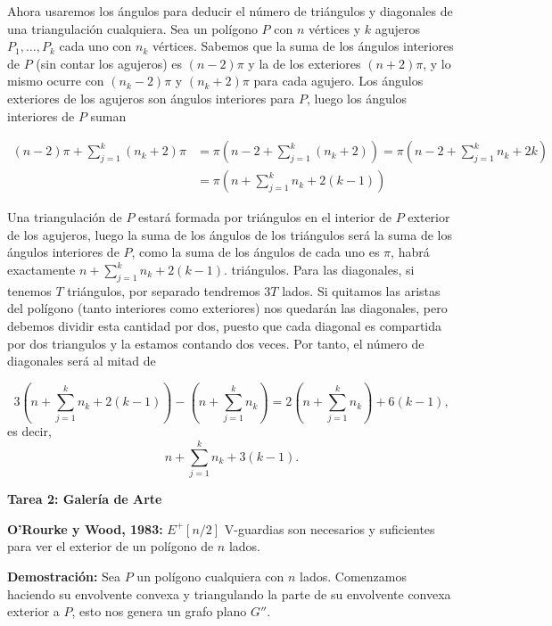 \documentclass{amsart}
\begin{document}
Ahora usaremos los ángulos para deducir el número de triángulos y diagonales de una triangulación cualquiera. Sea un polígono $P$ con $n$ vértices y $k$ agujeros $P_1,\ldots, P_k$ cada uno con $n_k$ vértices. Sabemos que la suma de los ángulos interiores de $P$ (sin contar los agujeros) es $(n-2)\pi$ y la de los exteriores $(n+2)\pi$, y lo mismo ocurre con $(n_k-2)\pi$ y $(n_k+2)\pi$ para cada agujero. Los ángulos exteriores de los agujeros son ángulos interiores para $P$, luego los ángulos interiores de $P$ suman

\begin{align*}
(n-2)\pi+\sum_{j=1}^k (n_k+2)\pi&=\pi\left(n-2+\sum_{j=1}^k (n_k+2)\right)=\pi\left(n-2+\sum_{j=1}^k n_k+2k\right)\\&=\pi\left(n+\sum_{j=1}^k n_k+2(k-1)\right)
\end{align*}

Una triangulación de $P$ estará formada por triángulos en el interior de $P$ exterior de los agujeros, luego la suma de los ángulos de los triángulos será la suma de los ángulos interiores de $P$, como la suma de los ángulos de cada uno es $\pi$, habrá exactamente $n+\sum\limits_{j=1}^k n_k+2(k-1)$. triángulos. Para las diagonales, si tenemos $T$ triángulos, por separado tendremos $3T$ lados. Si quitamos las aristas del polígono (tanto interiores como exteriores) nos quedarán las diagonales, pero debemos dividir esta cantidad por dos, puesto que cada diagonal es compartida por dos triangulos y la estamos contando dos veces. Por tanto, el número de diagonales será al mitad de 

\[3\left(n+\sum_{j=1}^k n_k+2(k-1)\right)-\left(n+\sum_{j=1}^k n_k\right)=2\left(n+\sum_{j=1}^k n_k\right)+6(k-1),\]
es decir,
\[n+\sum_{j=1}^k n_k+3(k-1).\]

\bigskip

\begin{center}
	\textbf{\large Tarea 2: Galería de Arte}
\end{center}

\bigskip

\textbf{O'Rourke y Wood, 1983:} $E^+[n/2]$ V-guardias son necesarios y suficientes para ver el exterior de un polígono de $n$ lados.

\bigskip

\textbf{Demostración:} Sea $P$ un polígono cualquiera con $n$ lados. Comenzamos haciendo su envolvente convexa y triangulando la parte de su envolvente convexa exterior a $P$, esto nos genera un grafo plano $G''$.
\end{document}

